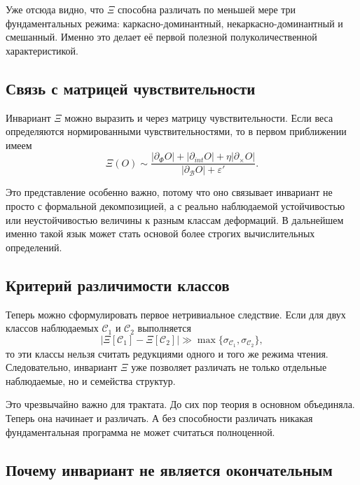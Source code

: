 \documentclass[12pt,a4paper]{article}
\begin{document}
Уже отсюда видно, что \(\Xi\) способна различать по меньшей мере три фундаментальных режима: каркасно-доминантный, некаркасно-доминантный и смешанный. Именно это делает её первой полезной полуколичественной характеристикой.

\subsection{Связь с матрицей чувствительности}

Инвариант \(\Xi\) можно выразить и через матрицу чувствительности. Если веса определяются нормированными чувствительностями, то в первом приближении имеем
\begin{equation}
\Xi(O) \sim \frac{|\partial_{\Phi} O| + |\partial_{int} O| + \eta |\partial_{\times} O|}{|\partial_{\mathcal{B}} O| + \varepsilon'}.
\end{equation}

Это представление особенно важно, потому что оно связывает инвариант не просто с формальной декомпозицией, а с реально наблюдаемой устойчивостью или неустойчивостью величины к разным классам деформаций. В дальнейшем именно такой язык может стать основой более строгих вычислительных определений.

\subsection{Критерий различимости классов}

Теперь можно сформулировать первое нетривиальное следствие. Если для двух классов наблюдаемых \(\mathcal{C}_1\) и \(\mathcal{C}_2\) выполняется
\begin{equation}
\big| \Xi[\mathcal{C}_1] - \Xi[\mathcal{C}_2] \big| \gg \max\{\sigma_{\mathcal{C}_1}, \sigma_{\mathcal{C}_2}\},
\end{equation}
то эти классы нельзя считать редукциями одного и того же режима чтения. Следовательно, инвариант \(\Xi\) уже позволяет различать не только отдельные наблюдаемые, но и семейства структур.

Это чрезвычайно важно для трактата. До сих пор теория в основном объединяла. Теперь она начинает и различать. А без способности различать никакая фундаментальная программа не может считаться полноценной.

\subsection{Почему инвариант не является окончательным}
\end{document}
